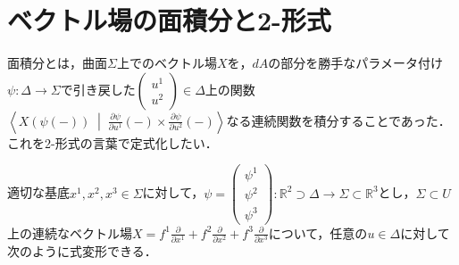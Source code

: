 \documentclass[uplatex, dvipdfmx]{jsreport}
\begin{document}
\section{ベクトル場の面積分と2-形式}

面積分とは，曲面$\Sigma$上でのベクトル場$X$を，$dA$の部分を勝手なパラメータ付け$\psi:\Delta\to\Sigma$で引き戻した$\begin{pmatrix}u^1\\u^2\end{pmatrix}\in\Delta$上の関数$\left\langle X(\psi(-))\;\middle|\; \frac{\partial \psi}{\partial u^1}(-)\times\frac{\partial \psi}{\partial u^2}(-) \right\rangle$なる連続関数を積分することであった．
これを2-形式の言葉で定式化したい．

適切な基底$x^1,x^2,x^3\in\Sigma$に対して，$\psi=\begin{pmatrix}\psi^1\\\psi^2\\\psi^3\end{pmatrix}:\mathbb{R}^2\supset\Delta\to\Sigma\subset\mathbb{R}^3$とし，$\Sigma\subset U$上の連続なベクトル場$X=f^1\frac{\partial}{\partial x^1}+f^2\frac{\partial}{\partial x^2}+f^3\frac{\partial}{\partial x^3}$について，任意の$u\in\Delta$に対して次のように式変形できる．
\end{document}
